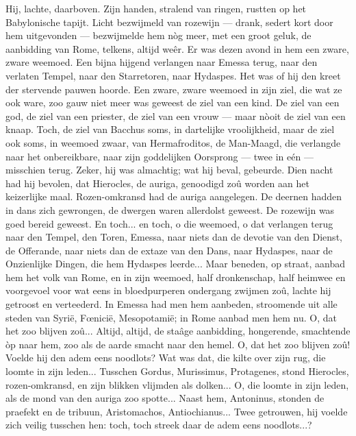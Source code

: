 \documentclass[a4paper, 12pt, oneside, dutch]{article}
\begin{document}
Hij, lachte, daarboven. Zijn handen, stralend van ringen, rustten op het Babylonische tapijt. Licht bezwijmeld van rozewijn --- drank, sedert kort door hem uitgevonden --- bezwijmelde hem nòg meer, met een groot geluk, de aanbidding van Rome, telkens, altijd weêr. Er was dezen avond in hem een zware, zware weemoed. Een bijna hijgend verlangen naar Emessa terug, naar den verlaten Tempel, naar den Starretoren, naar Hydaspes. Het was of hij den kreet der stervende pauwen hoorde. Een zware, zware weemoed in zijn ziel, die wat ze ook ware, zoo gauw niet meer was geweest de ziel van een kind. De ziel van een god, de ziel van een priester, de ziel van een vrouw --- maar nòoit de ziel van een knaap. Toch, de ziel van Bacchus soms, in dartelijke vroolijkheid, maar de ziel ook soms, in weemoed zwaar, van Hermafroditos, de Man-Maagd, die verlangde naar het onbereikbare, naar zijn goddelijken Oorsprong --- twee in eén --- misschien terug. Zeker, hij was almachtig; wat hij beval, gebeurde. Dien nacht had hij bevolen, dat Hierocles, de auriga, genoodigd zoû worden aan het keizerlijke maal. Rozen-omkransd had de auriga aangelegen. De deernen hadden in dans zich gewrongen, de dwergen waren allerdolst geweest. De rozewijn was goed bereid geweest. En toch... en toch, o die weemoed, o dat verlangen terug naar den Tempel, den Toren, Emessa, naar niets dan de devotie van den Dienst, de Offerande, naar niets dan de extaze van den Dans, naar Hydaspes, naar de Onzienlijke Dingen, die hem Hydaspes leerde... Maar beneden, op straat, aanbad hem het volk van Rome, en in zijn weemoed, half dronkenschap, half heimwee en voorgevoel voor wat eens in bloedpurperen ondergang zwijmen zoû, lachte hij getroost en verteederd. In Emessa had men hem aanbeden, stroomende uit alle steden van Syrië, Fœnicië, Mesopotamië; in Rome aanbad men hem nu. O, dat het zoo blijven zoû... Altijd, altijd, de staâge aanbidding, hongerende, smachtende òp naar hem, zoo als de aarde smacht naar den hemel. O, dat het zoo blijven zoû! Voelde hij den adem eens noodlots? Wat was dat, die kilte over zijn rug, die loomte in zijn leden... Tusschen Gordus, Murissimus, Protagenes, stond Hierocles, rozen-omkransd, en zijn blikken vlijmden als dolken... O, die loomte in zijn leden, als de mond van den auriga zoo spotte... Naast hem, Antoninus, stonden de praefekt en de tribuun, Aristomachos, Antiochianus... Twee getrouwen, hij voelde zich veilig tusschen hen: toch, toch streek daar de adem eens noodlots...?
\end{document}
